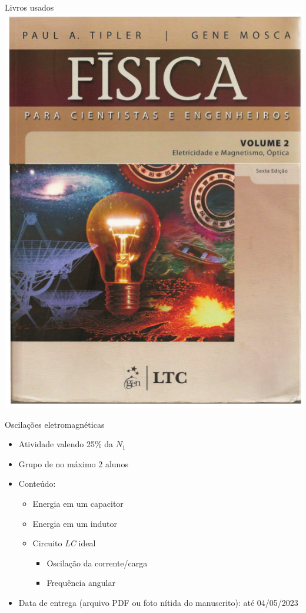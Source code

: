 \begin{frame}{Livros usados}
    \includegraphics[height=0.75\textheight]{images/tipler2}
\end{frame}

\begin{frame}{Oscilações eletromagnéticas}
    \begin{itemize}
        \item Atividade valendo 25\% da \(N_1\)
        \item Grupo de no máximo 2 alunos
        \item Conteúdo:
            \begin{itemize}
                \item Energia em um capacitor
                \item Energia em um indutor
                \item Circuito \textit{LC} ideal
                    \begin{itemize}
                        \item Oscilação da corrente/carga
                        \item Frequência angular
                    \end{itemize}
            \end{itemize}
        \item Data de entrega (arquivo PDF ou foto nítida do manuscrito): até 04/05/2023
    \end{itemize}
\end{frame}

